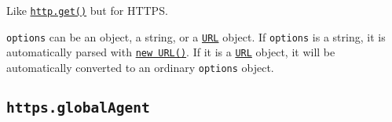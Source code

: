 Like \href{http.md\#httpgetoptions-callback}{\texttt{http.get()}} but
for HTTPS.

\texttt{options} can be an object, a string, or a
\href{url.md\#the-whatwg-url-api}{\texttt{URL}} object. If
\texttt{options} is a string, it is automatically parsed with
\href{url.md\#new-urlinput-base}{\texttt{new\ URL()}}. If it is a
\href{url.md\#the-whatwg-url-api}{\texttt{URL}} object, it will be
automatically converted to an ordinary \texttt{options} object.

\begin{Shaded}
\begin{Highlighting}[]
\OperatorTok{=} \NormalTok{(}\NormalTok{)}\OperatorTok{;}

\NormalTok{(}\OperatorTok{,}\KeywordTok{=\textgreater{}}\NormalTok{ \{}
  \NormalTok{(}\OperatorTok{,}\NormalTok{)}\OperatorTok{;}
  \NormalTok{(}\OperatorTok{,}\NormalTok{)}\OperatorTok{;}

\NormalTok{(}\OperatorTok{,}\KeywordTok{=\textgreater{}}\NormalTok{ \{}
    \OperatorTok{;}
\NormalTok{  \})}\OperatorTok{;}

\NormalTok{\})}\NormalTok{(}\OperatorTok{,}\KeywordTok{=\textgreater{}}\NormalTok{ \{}
  \OperatorTok{;}
\NormalTok{\})}\OperatorTok{;}
\end{Highlighting}
\end{Shaded}

\subsection{\texorpdfstring{\texttt{https.globalAgent}}{https.globalAgent}}\label{https.globalagent}

